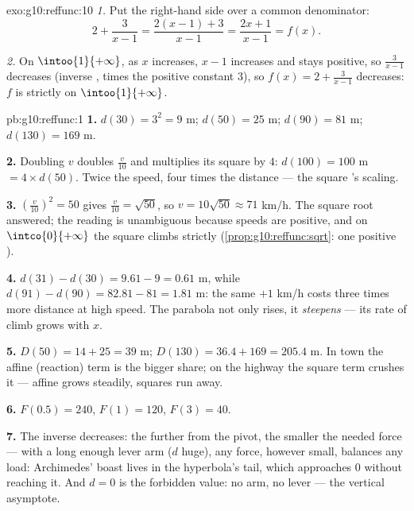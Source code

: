 \begin{solution}{exo:g10:reffunc:10}
\emph{1.} Put the right-hand side over a common denominator:
\[
2 + \frac{3}{x-1} = \frac{2(x-1) + 3}{x - 1} = \frac{2x + 1}{x - 1}
= f(x).
\]

\emph{2.} On $\intoo{1}{+\infty}$, as $x$ increases, $x - 1$ increases
and stays positive, so $\frac{3}{x-1}$ decreases (inverse , times
the positive constant $3$), so $f(x) = 2 + \frac{3}{x-1}$ decreases:
$f$ is strictly  on $\intoo{1}{+\infty}$.
\end{solution}

\begin{solution}{pb:g10:reffunc:1}
\textbf{1.} $d(30) = 3^2 = 9$ m; $d(50) = 25$ m; $d(90) =
81$ m; $d(130) = 169$ m.

\textbf{2.} Doubling $v$ doubles $\frac v{10}$ and multiplies
its square by $4$: $d(100) = 100$ m $= 4 \times d(50)$. Twice
the speed, four times the distance --- the square 's
scaling.

\textbf{3.} $\left(\frac{v}{10}\right)^2 = 50$ gives
$\frac{v}{10} = \sqrt{50}$, so $v = 10\sqrt{50} \approx 71$
km/h. The square root answered; the reading is unambiguous
because speeds are positive, and on
$\intco{0}{+\infty}$ the square  climbs strictly
(\cref{prop:g10:reffunc:sqrt}: one positive ).

\textbf{4.} $d(31) - d(30) = 9.61 - 9 = 0.61$ m, while
$d(91) - d(90) = 82.81 - 81 = 1.81$ m: the same $+1$ km/h costs
three times more distance at high speed. The parabola not only
rises, it \emph{steepens} --- its rate of climb grows with $x$.

\textbf{5.} $D(50) = 14 + 25 = 39$ m; $D(130) = 36.4 + 169 =
205.4$ m. In town the affine (reaction) term is the bigger
share; on the highway the square term crushes it --- affine
grows steadily, squares run away.

\textbf{6.} $F(0.5) = 240$, $F(1) = 120$, $F(3) = 40$.

\textbf{7.} The inverse  decreases: the further from
the pivot, the smaller the needed force --- with a long enough
lever arm ($d$ huge), any force, however small, balances any
load: Archimedes' boast lives in the hyperbola's tail, which
approaches $0$ without reaching it. And $d = 0$ is the
forbidden value: no arm, no lever --- the vertical asymptote.


\end{solution}
